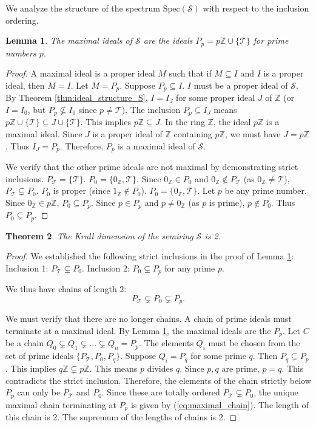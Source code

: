 \documentclass[11pt, a4paper]{article}
\theoremstyle{plain}
\newtheorem{theorem}{Theorem}[section]
\newtheorem{lemma}[theorem]{Lemma}
\theoremstyle{definition}
\numberwithin{equation}{section}
\newcommand{\Z}{\mathbb{Z}}
\newcommand{\Tobj}{\mathcal{T}} %
\newcommand{\SemiringS}{\mathcal{S}}
\newcommand{\Spec}{\mathrm{Spec}}
\begin{document}
We analyze the structure of the spectrum $\Spec(\SemiringS)$ with respect to the inclusion ordering.

\begin{lemma}\label{lem:maximal_ideals_S}
The maximal ideals of $\SemiringS$ are the ideals $P_p = p\Z \cup \{\Tobj\}$ for prime numbers $p$.
\end{lemma}
\begin{proof}
A maximal ideal is a proper ideal $M$ such that if $M \subseteq I$ and $I$ is a proper ideal, then $M=I$.
Let $M=P_p$. Suppose $P_p \subseteq I$. $I$ must be a proper ideal of $\SemiringS$. By Theorem \ref{thm:ideal_structure_S}, $I=I_J$ for some proper ideal $J$ of $\Z$ (or $I=I_0$, but $P_p \not\subseteq I_0$ since $p\neq \Tobj$).
The inclusion $P_p \subseteq I_J$ means $p\Z \cup \{\Tobj\} \subseteq J \cup \{\Tobj\}$. This implies $p\Z \subseteq J$.
In the ring $\Z$, the ideal $p\Z$ is a maximal ideal. Since $J$ is a proper ideal of $\Z$ containing $p\Z$, we must have $J=p\Z$.
Thus $I_J=P_p$. Therefore, $P_p$ is a maximal ideal of $\SemiringS$.

We verify that the other prime ideals are not maximal by demonstrating strict inclusions.
$P_{\Tobj}=\{\Tobj\}$. $P_0=\{0_{\Z}, \Tobj\}$. Since $0_{\Z} \in P_0$ and $0_{\Z} \notin P_{\Tobj}$ (as $0_{\Z} \neq \Tobj$), $P_{\Tobj} \subsetneq P_0$. $P_0$ is proper (since $1_{\Z} \notin P_0$).
$P_0=\{0_{\Z}, \Tobj\}$. Let $p$ be any prime number. Since $0_{\Z} \in p\Z$, $P_0 \subseteq P_p$. Since $p \in P_p$ and $p \neq 0_{\Z}$ (as $p$ is prime), $p \notin P_0$. Thus $P_0 \subsetneq P_p$.
\end{proof}

\begin{theorem}\label{thm:krull_dim_S}
The Krull dimension of the semiring $\SemiringS$ is 2.
\end{theorem}
\begin{proof}
We established the following strict inclusions in the proof of Lemma \ref{lem:maximal_ideals_S}:
Inclusion 1: $P_{\Tobj} \subsetneq P_{0}$.
Inclusion 2: $P_{0} \subsetneq P_{p}$ for any prime $p$.

We thus have chains of length 2:
\begin{equation}\label{eq:maximal_chain}
    P_{\Tobj} \subsetneq P_0 \subsetneq P_p.
\end{equation}

We must verify that there are no longer chains. A chain of prime ideals must terminate at a maximal ideal. By Lemma \ref{lem:maximal_ideals_S}, the maximal ideals are the $P_p$.
Let $C$ be a chain $Q_0 \subsetneq Q_1 \subsetneq \dots \subsetneq Q_n = P_p$.
The elements $Q_i$ must be chosen from the set of prime ideals $\{P_{\Tobj}, P_0, P_q\}$.
Suppose $Q_i=P_q$ for some prime $q$. Then $P_q \subsetneq P_p$. This implies $q\Z \subsetneq p\Z$. This means $p$ divides $q$. Since $p, q$ are prime, $p=q$. This contradicts the strict inclusion.
Therefore, the elements of the chain strictly below $P_p$ can only be $P_{\Tobj}$ and $P_0$.
Since these are totally ordered $P_{\Tobj} \subsetneq P_0$, the unique maximal chain terminating at $P_p$ is given by (\ref{eq:maximal_chain}).
The length of this chain is 2. The supremum of the lengths of chains is 2.
\end{proof}
\end{document}
